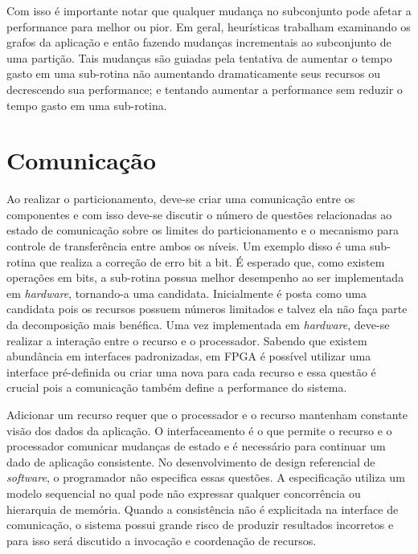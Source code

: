 Com isso é importante notar que qualquer mudança no subconjunto pode afetar a performance para melhor ou pior. Em geral, heurísticas trabalham examinando os grafos da aplicação e então fazendo mudanças incrementais ao subconjunto de uma partição. Tais mudanças são guiadas pela tentativa de aumentar o tempo gasto em uma sub-rotina não aumentando dramaticamente seus recursos ou decrescendo sua performance; e tentando aumentar a performance sem reduzir o tempo gasto em uma sub-rotina.



\section{Comunicação}

Ao realizar o particionamento, deve-se criar uma comunicação entre os componentes e com isso deve-se discutir o número de questões relacionadas ao estado de comunicação sobre os limites do particionamento e o mecanismo para controle de transferência entre ambos os níveis. Um exemplo disso é uma sub-rotina que realiza a correção de erro bit a bit. É esperado que, como existem operações em bits, a sub-rotina possua melhor desempenho ao ser implementada em \textit{hardware}, tornando-a uma candidata. Inicialmente é posta como uma candidata pois os recursos possuem números limitados e talvez ela não faça parte da decomposição mais benéfica. Uma vez implementada em \textit{hardware}, deve-se realizar a interação entre o recurso e o processador. Sabendo que existem abundância em interfaces padronizadas, em FPGA é possível utilizar uma interface pré-definida ou criar uma nova para cada recurso e essa questão é crucial pois a comunicação também define a performance do sistema.



Adicionar um recurso requer que o processador e o recurso mantenham constante visão dos dados da aplicação. O interfaceamento é o que permite o recurso e o processador comunicar mudanças de estado e é necessário para continuar um dado de aplicação consistente. No desenvolvimento de design referencial de \textit{software}, o programador não especifica essas questões. A especificação utiliza um modelo sequencial no qual pode não expressar qualquer concorrência ou hierarquia de memória. Quando a consistência não é explicitada na interface de comunicação, o sistema possui grande risco de produzir resultados incorretos e para isso será discutido a invocação e coordenação de recursos.



